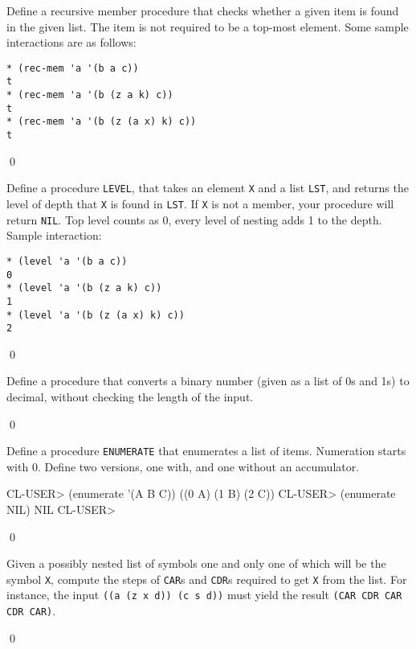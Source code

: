 \documentclass[a4paper,11pt]{article}
\begin{document}
\begin{uexercise}

Define a recursive member procedure that checks whether a given item is found in the given list. The item is not required to be a top-most element. Some sample interactions are as follows:

\begin{Verbatim}
* (rec-mem 'a '(b a c))
t
* (rec-mem 'a '(b (z a k) c))
t
* (rec-mem 'a '(b (z (a x) k) c))
t
\end{Verbatim}

\qed
\end{uexercise}

\begin{uexercise}[*]

Define a procedure \Verb+LEVEL+, that takes an element \Verb+X+ and a
list \Verb+LST+, and returns the level of depth that \Verb+X+ is found
in \Verb+LST+. If \Verb+X+ is not a member, your procedure will return
\Verb+NIL+. Top level counts as 0, every level of nesting adds 1 to
the depth. Sample interaction:

\begin{Verbatim}
* (level 'a '(b a c))
0
* (level 'a '(b (z a k) c))
1
* (level 'a '(b (z (a x) k) c))
2
\end{Verbatim}

\qed
\end{uexercise}

\begin{uexercise}[*]

Define a procedure that converts a binary number (given as a list of 0s and 1s)
to decimal, without checking the length of the input. 

\qed
\end{uexercise}

\begin{uexercise}[*]
\label{exenumerate}
Define a procedure \Verb+ENUMERATE+ that enumerates a list of items. Numeration
starts with 0. Define two versions, one with, and one without an accumulator.

\begin{lispcode}
CL-USER> (enumerate '(A B C))
((0 A) (1 B) (2 C))
CL-USER> (enumerate NIL)
NIL
CL-USER> 
\end{lispcode}

\qed
\end{uexercise}

\begin{uexercise}[*]

Given a possibly nested list of symbols one and only one of which will
be the symbol \Verb+X+, compute the steps of \Verb+CAR+s and
\Verb+CDR+s required to get \Verb+X+ from the list.  For instance, the
input \Verb+((a (z x d)) (c s d))+ must yield the result \Verb+(CAR CDR CAR CDR CAR)+.  

\qed
\end{uexercise}
\end{document}
